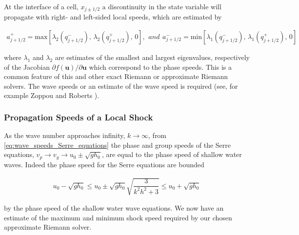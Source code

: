 \documentclass[SingleSpace,12pt]{Serre_ASCE}
\begin{document}
At the interface of a cell, $x_{j \pm 1/2}$ a discontinuity in the state variable will propagate with right- and left-sided local speeds, which are estimated by
\begin{linenomath*}
\begin{subequations}
\label{eq:shock_speeds}
\begin{gather*}
a^+_{j+1/2} = \text{max}\left [ \lambda_2(q_{j+1/2}^-), \, \lambda_2(q_{j+1/2}^+), \, 0 \right ],
\end{gather*}
and
\begin{gather*}
a^-_{j+1/2} = \text{min}\left [ \lambda_1 (q_{j+1/2}^-), \, \lambda_1 (q_{j+1/2}^+), \,0 \right ]
\end{gather*}
\end{subequations}
\end{linenomath*}
where $\lambda_1$ and $\lambda_2$ are estimates of the smallest and largest eigenvalues, respectively  of the Jacobian $\partial f(\mathbf{u})/\partial \mathbf{u}$ which correspond to the phase speeds. This is a common feature of this and other exact Riemann or approximate Riemann solvers. The wave speeds or an estimate of the wave speed is required (see, for example Zoppou and Roberts \cite{Zoppou-Roberts-2003-11}).

\subsubsection{Propagation Speeds of a Local Shock} %

As the wave number approaches infinity, $k \rightarrow \infty$, from \eqref{eq:wave_speeds_Serre_equations} the phase and group speeds of the Serre equations,  $v_p \rightarrow v_g \rightarrow u_0 \pm \sqrt{g h_0}$, are equal to the phase speed of shallow water waves. Indeed the phase speed for the Serre equations are bounded
\begin{linenomath*}
\begin{gather*}
u_0 - \sqrt{g h_0} \le u_0 \pm \sqrt{gh_0}\sqrt{\dfrac{3}{k^2h^2 + 3}} \le u_0 + \sqrt{g h_0}
\end{gather*}
\end{linenomath*}
by the phase speed of the shallow water wave equations. We now have an estimate of the maximum and minimum shock speed required by our chosen approximate Riemann solver.

\end{document}
